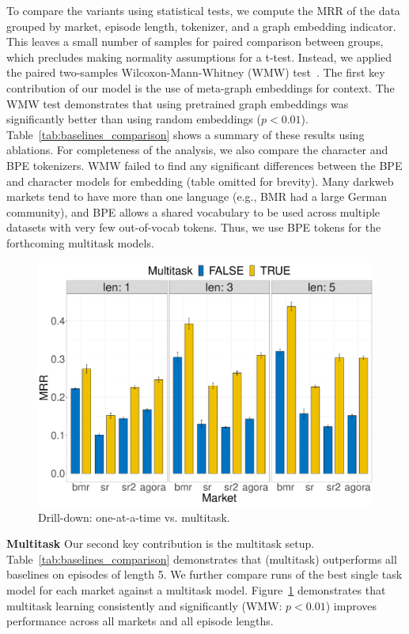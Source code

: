 To compare the variants using statistical tests, we compute the MRR of the data grouped by market, episode length, tokenizer, and a graph embedding indicator.
This leaves a small number of samples for paired comparison between groups, which precludes making normality assumptions for a t-test. 
Instead, we applied the paired two-samples Wilcoxon-Mann-Whitney (WMW) test~\cite{mann1947test}.
The first key contribution of our model is the use of meta-graph embeddings for context. 
The WMW test demonstrates that using pretrained graph embeddings was significantly better than using random embeddings ($p < 0.01$). 
Table~\ref{tab:baselines_comparison} shows a summary of these results using ablations.
For completeness of the analysis, we also compare the character and BPE tokenizers.
WMW failed to find any significant differences between the BPE and character models for embedding (table omitted for brevity). 
Many darkweb markets tend to have more than one language (e.g., BMR had a large German community), and BPE  allows a shared vocabulary to be used across multiple datasets with very few out-of-vocab tokens. 
Thus, we use BPE tokens for the forthcoming multitask models.
\begin{figure}[!htbp]
    \centering
    \includegraphics[width=0.8\linewidth]{sysml/plots/multitask.pdf}
    \caption{Drill-down: one-at-a-time vs. multitask.}
    \label{fig:multitask_results}
\end{figure} 

\noindent \textbf{Multitask} Our second key contribution is the multitask setup.
Table~\ref{tab:baselines_comparison} demonstrates that \SYSMLmethodname{} (multitask) outperforms all baselines on episodes of length 5. We further compare runs of the best single task model for each market against a multitask model. %
Figure~\ref{fig:multitask_results} demonstrates that multitask learning  consistently and significantly (WMW: $p < 0.01$) improves performance across all markets and all episode lengths. 




